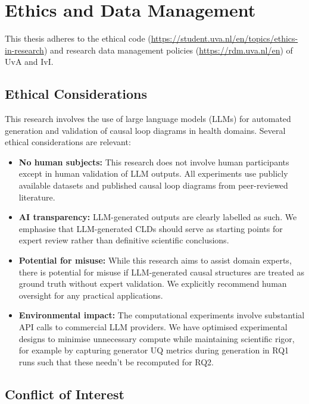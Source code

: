 \chapter{Ethics and Data Management}
\label{ch:ethics}

This thesis adheres to the ethical code (\url{https://student.uva.nl/en/topics/ethics-in-research}) and research data management policies (\url{https://rdm.uva.nl/en}) of UvA and IvI.

\section{Ethical Considerations}

This research involves the use of large language models (LLMs) for automated generation and validation of causal loop diagrams in health domains. Several ethical considerations are relevant:

\begin{itemize}
    \item \textbf{No human subjects:} This research does not involve human participants except in human validation of LLM outputs. All experiments use publicly available datasets and published causal loop diagrams from peer-reviewed literature.
    
    \item \textbf{AI transparency:} LLM-generated outputs are clearly labelled as such. We emphasise that LLM-generated CLDs should serve as starting points for expert review rather than definitive scientific conclusions.
    
    \item \textbf{Potential for misuse:} While this research aims to assist domain experts, there is potential for misuse if LLM-generated causal structures are treated as ground truth without expert validation. We explicitly recommend human oversight for any practical applications.
    
    \item \textbf{Environmental impact:} The computational experiments involve substantial API calls to commercial LLM providers. We have optimised experimental designs to minimise unnecessary compute while maintaining scientific rigor, for example by capturing generator UQ metrics during generation in RQ1 runs such that these needn't be recomputed for RQ2.
\end{itemize}

\section{Conflict of Interest}

